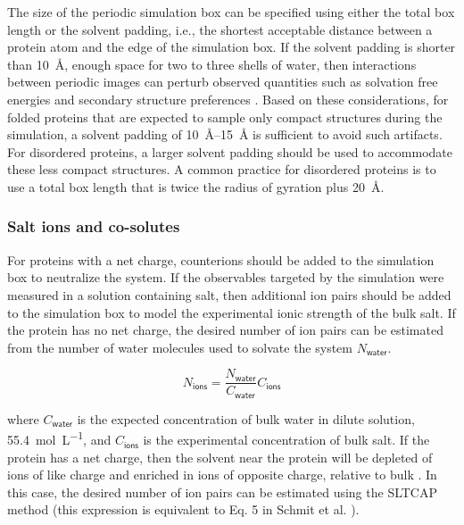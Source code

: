 \documentclass[9pt,review,pubversion]{livecoms}
\begin{document}
The size of the periodic simulation box can be specified using either the total box length or the solvent padding, i.e., the shortest acceptable distance between a protein atom and the edge of the simulation box.
If the solvent padding is shorter than \qty{10}{\angstrom}, enough space for two to three shells of water, then interactions between periodic images can perturb observed quantities such as solvation free energies and secondary structure preferences 
\cite{mehra_cell_2019,gapsys_importance_2020}.
Based on these considerations, for folded proteins that are expected to sample only compact structures during the simulation, a solvent padding of \qtyrange{10}{15}{\angstrom} is sufficient to avoid such artifacts.
For disordered proteins, a larger solvent padding should be used to accommodate these less compact structures.
A common practice for disordered proteins is to use a total box length that is twice the radius of gyration plus \qty{20}{\angstrom}.

\subsubsection{Salt ions and co-solutes}
\label{sub2:salt}

For proteins with a net charge, counterions should be added to the simulation box to neutralize the system.
If the observables targeted by the simulation were measured in a solution containing salt, then additional ion pairs should be added to the simulation box to model the experimental ionic strength of the bulk salt.
If the protein has no net charge, the desired number of ion pairs can be estimated from the number of water molecules used to solvate the system $N_{\mathsf{water}}$.

\begin{equation}
\label{eqn:ions_neutral}
N_{\mathsf{ions}} = \frac {N_{\mathsf{water}}} {C_{\mathsf{water}}} C_{\mathsf{ions}}
\end{equation}

\noindent where $C_{\mathsf{water}}$ is the expected concentration of bulk water in dilute solution, \qty{55.4}{\mol\per\liter}, and $C_{\mathsf{ions}}$ is the experimental concentration of bulk salt.
If the protein has a net charge, then the solvent near the protein will be depleted of ions of like charge and enriched in ions of opposite charge, relative to bulk \cite{schmit_sltcap_2018}.
In this case, the desired number of ion pairs can be estimated using the SLTCAP method (this expression is equivalent to Eq. 5 in Schmit et al. \cite{schmit_sltcap_2018}).
\end{document}

